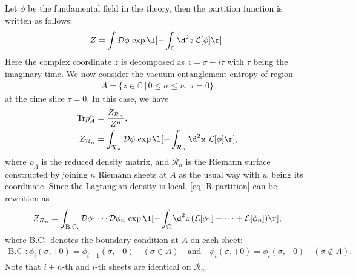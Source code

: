 \documentclass[12pt]{article}
\begin{document}
Let $\phi$ be the fundamental field in the theory, then the partition function is written as follows:
\begin{align}
	Z = \int\mathcal D\phi\,\exp\l[-\int_{\mathbb C}\d^2 z\,\mathcal L[\phi]\r].
\end{align}
Here the complex coordinate $z$ is decomposed as $z = \sigma + i\tau$ with $\tau$ being the imaginary time.
We now consider the vacuum entanglement entropy of region
\begin{align}
	A = \{z\in\mathbb C\,|\,0 \leq \sigma\leq u,~\tau = 0\}
\end{align}
at the time slice $\tau = 0$.
In this case, we have
\begin{align}
	\mathrm{Tr}\rho_A^n &= \frac{Z_{\mathcal{R}_n}}{Z^n},\label{eq: Tr rho}\\
	Z_{\mathcal R_n} &= 
		\int_{\mathcal R_n}\mathcal D\phi\,\exp\l[-\int_{\mathcal R_n}\d^2 w\,\mathcal L[\phi]\r],
		\label{eq: R partition}
\end{align}
where $\rho_A$ is the reduced density matrix, and $\mathcal R_n$ is the Riemann surface constructed by joining $n$ Riemann sheets at $A$ as the usual way with $w$ being its coordinate.
Since the Lagrangian density is local, \eqref{eq: R partition} can be rewritten as
\begin{align}
	Z_{\mathcal R_n} = \int_\mathrm{B.C.}\mathcal D\phi_1\cdots\mathcal D\phi_n\,
	\exp\l[-\int_{\mathbb C}\d^2 z\,(\mathcal L[\phi_1]+\cdots+\mathcal L[\phi_n])\r],
	\label{eq: n partition}
\end{align}
where B.C.\ denotes the boundary condition at $A$ on each sheet:
\begin{align}
	\mathrm{B.C.}:\phi_i(\sigma,+0) = \phi_{i+1}(\sigma,-0)\quad(\sigma\in A)\quad
	\mathrm{and}\quad
	\phi_i(\sigma,+0) = \phi_i(\sigma,-0)\quad(\sigma\not\in A). 
	\label{eq: BC}
\end{align}
Note that $i+n$-th and $i$-th sheets are identical on $\mathcal R_n$.
\end{document}
